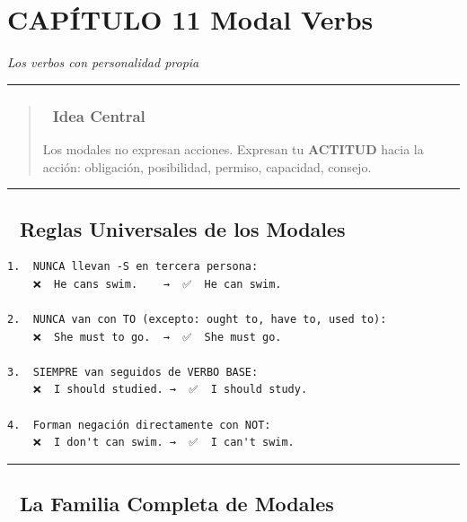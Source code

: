 \documentclass[
  spanish,
  letterpaper,
]{scrbook}
\begin{document}
\chapter{CAPÍTULO 11 Modal Verbs}\label{capuxedtulo-11-modal-verbs}

\emph{Los verbos con personalidad propia}

\begin{center}\rule{0.5\linewidth}{0.5pt}\end{center}

\begin{quote}
\subsection{🎯 Idea Central}\label{idea-central-9}

Los modales no expresan acciones. Expresan tu \textbf{ACTITUD} hacia la
acción: obligación, posibilidad, permiso, capacidad, consejo.
\end{quote}

\begin{center}\rule{0.5\linewidth}{0.5pt}\end{center}

\section{📐 Reglas Universales de los
Modales}\label{reglas-universales-de-los-modales}

\begin{verbatim}
1.  NUNCA llevan -S en tercera persona:
    ❌  He cans swim.    →  ✅  He can swim.

2.  NUNCA van con TO (excepto: ought to, have to, used to):
    ❌  She must to go.  →  ✅  She must go.

3.  SIEMPRE van seguidos de VERBO BASE:
    ❌  I should studied. →  ✅  I should study.

4.  Forman negación directamente con NOT:
    ❌  I don't can swim. →  ✅  I can't swim.
\end{verbatim}

\begin{center}\rule{0.5\linewidth}{0.5pt}\end{center}

\section{📐 La Familia Completa de
Modales}\label{la-familia-completa-de-modales}
\end{document}
